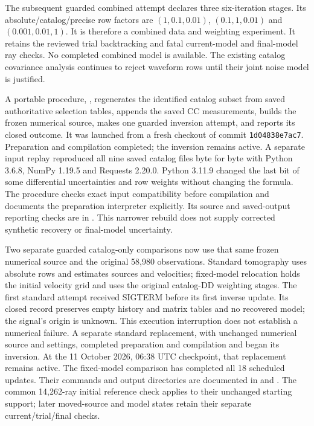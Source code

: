 The subsequent guarded combined attempt declares three six-iteration stages.
Its absolute/catalog/precise row factors are $(1,0.1,0.01)$,
$(0.1,1,0.01)$ and $(0.001,0.01,1)$. It is therefore a combined data and
weighting experiment. It retains the reviewed trial backtracking and fatal
current-model and final-model ray checks. No completed combined model is
available. The existing catalog covariance analysis continues to reject
waveform rows until their joint noise model is justified.

A portable procedure, , regenerates the
identified catalog subset from saved authoritative selection tables, appends
the saved CC measurements, builds the frozen numerical source, makes one
guarded inversion attempt, and reports its closed outcome. It was launched
from a fresh checkout of commit \texttt{1d04838e7ac7}. Preparation and compilation
completed; the inversion remains active. A separate input replay reproduced
all nine saved catalog files byte for byte with Python 3.6.8, NumPy 1.19.5 and
Requests 2.20.0. Python 3.11.9 changed the last bit of some differential
uncertainties and row weights without changing the formula. The procedure
checks exact input compatibility before compilation and documents the
preparation interpreter explicitly. Its source and saved-output reporting
checks are in .
This narrower rebuild does not supply corrected synthetic recovery or
final-model uncertainty.

Two separate guarded catalog-only comparisons now use that same frozen
numerical source and the original 58,980 observations. Standard tomography
uses absolute rows and estimates sources and velocities; fixed-model
relocation holds the initial velocity grid and uses the original catalog-DD
weighting stages. The first standard attempt received SIGTERM before its
first inverse update. Its closed record preserves empty history and matrix
tables and no recovered model; the signal's origin is unknown. This execution
interruption does not establish a numerical failure. A separate standard
replacement, with unchanged numerical source and settings, completed
preparation and compilation and began its inversion. At the 11 October 2026,
06:38 UTC checkpoint, that replacement remains active. The fixed-model
comparison has completed all 18 scheduled updates. Their commands
and output directories are documented in
 and .
The common 14,262-ray initial reference check applies to their unchanged
starting support; later moved-source and model states retain their separate
current/trial/final checks.

